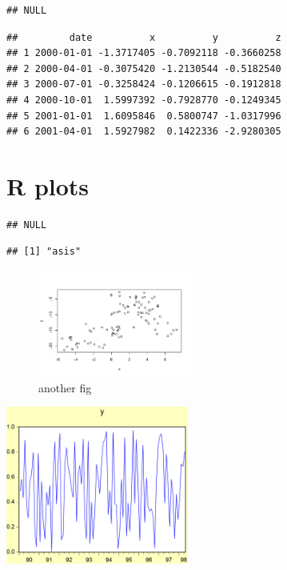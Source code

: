 \documentclass[
]{article}
\begin{document}
\begin{verbatim}
## NULL
\end{verbatim}

\begin{verbatim}
##         date          x          y          z
## 1 2000-01-01 -1.3717405 -0.7092118 -0.3660258
## 2 2000-04-01 -0.3075420 -1.2130544 -0.5182540
## 3 2000-07-01 -0.3258424 -0.1206615 -0.1912818
## 4 2000-10-01  1.5997392 -0.7928770 -0.1249345
## 5 2001-01-01  1.6095846  0.5800747 -1.0317996
## 6 2001-04-01  1.5927982  0.1422336 -2.9280305
\end{verbatim}

\hypertarget{r-plots}{%
\section{R plots}\label{r-plots}}

\begin{verbatim}
## NULL
\end{verbatim}

\begin{verbatim}
## [1] "asis"
\end{verbatim}

\begin{figure}[h]

{\centering \includegraphics[width=0.45\textwidth]{test_engEviews_files/figure-latex/labe-1} 

}

\caption{another fig}\label{fig:labe}
\end{figure}

\begin{center}\includegraphics[width=0.45\textwidth]{test_engEviews_files/figure-latex//eview-graph-y} \end{center}
\end{document}
